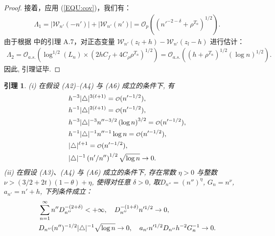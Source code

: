 \documentclass[a4paper,openay,14pt]{ctexbook}
\newtheorem{lem}{引理}
\numberwithin{equation}{section}
\numberwithin{lem}{section}
\begin{document}
\begin{proof}
接着，应用 (\ref{EQU:cov})，我们有：
\begin{align*}
    \Lambda_1 = \left\vert \mathcal{W}_{n'}(-n')\right\vert+ \left\vert \mathcal{W}_{n'}(n')\right\vert = \mathcal{O}_{p}\left(\left(n'^{-2-\delta}+\rho^{T_n}\right)^{1/2}\right).
\end{align*}
由于根据 \cite{wang2022oracle} 中的引理 A.7，对正态变量 $\mathcal{W}_{n'}(z_l+h) - \mathcal{W}_{n'}(z_l-h)$ 进行估计：
\begin{align*}
    \Lambda_2 = \mathcal{O}_{a.s.}\left(\log^{1/2}(L_n)\times(2hC_f+4C_{\rho}{\rho}^{T_n})^{1/2}\right) = \mathcal{O}_{a.s.}\left(\left(h+\rho^{T_n}\right)^{1/2}\left(\log n\right)^{1/2}\right).
\end{align*}
因此, 引理证毕.
\end{proof}


\begin{lem} \label{Lemma:order}
    (i) 在假设 (A2)--(A4) 与 (A6) 成立的条件下, 有
    \begin{align}
        & h^{-3}\vert \triangle \vert ^{3(\ell+1)} = {\scriptstyle{\mathcal{O}}}(n'^{-1/2}),\label{EQ:h^-3delta^3d+3}\\
        & h^{-1} \vert \triangle \vert ^{2(\ell+1)} = {\scriptstyle{\mathcal{O}}}(n'^{-1/2}), \notag\\ 
        & h^{-3}\vert \triangle \vert ^{-3} n''^{-3/2} \left(\log n \right)^{3/2} = {\scriptstyle{\mathcal{O}}}(n'^{-1/2}),\label{EQ:h^-3delta^-3} \\ 
        & h^{-1}\vert \triangle \vert^{-1}n''^{-1}
        \log n = {\scriptstyle{\mathcal{O}}}(n'^{-1/2}),\notag\\
        & \vert\triangle \vert^{\ell+1}= {\scriptstyle{\mathcal{O}}}(n'^{-1/2}), \label{EQ:delta^d+1}\\
        & \vert\triangle\vert^{-1} \left(n'/n''\right)^{1/2}\sqrt{\log n}\to 0.\label{EQ:delta^-1n'/n''}
    \end{align}
    (ii) 在假设 (A3)、(A4) 与 (A6) 成立的条件下, 存在常数 $\eta>0$ 与整数$\nu>(3/2+2t)(1-\theta)+\eta$, 使得对任意 $\delta>0$, 取$D_{n''}=(n'')^{\eta}$, $G_n=n^{\nu}$, $a_{n'}=n'+h$, 下列条件成立：
    \begin{align}
        & \sum_{n=1}^{\infty} n''D_{n''}^{-(2+\delta)} < +\infty, \quad D_{n''}^{-(1+\delta)} n'^{1/2} \to 0,\label{EQ:Dn''order}\\
        & D_{n''}(n'')^{-1/2}\vert\triangle\vert^{-1}\sqrt{\log n} \to 0, \quad a_{n'}n'^{1/2}D_{n''}h^{-2}G_n^{-1}\to 0.\notag
    \end{align}
\end{lem}
\end{document}
